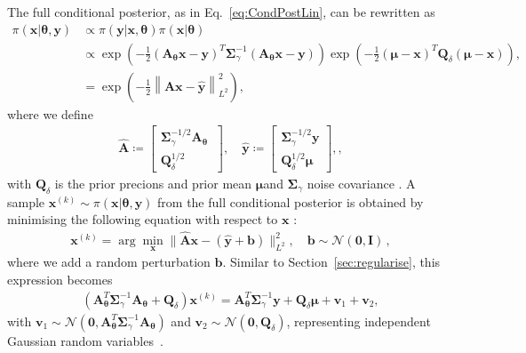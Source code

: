 The full conditional posterior, as in Eq.~\ref{eq:CondPostLin}, can be rewritten as
\begin{align}
	\pi(\bm{x} | \bm{\theta},  \bm{y}) & \propto \pi(\bm{y}|\bm{x}, \bm{\theta}) \pi(\bm{x}| \bm{\theta})\\
	&\propto \exp \left(-\frac{1}{2} (\bm{A}_{\bm{\theta}}  \bm{x} - \bm{y})^T \bm{\Sigma}^{-1}_{\gamma} (\bm{A}_{\bm{\theta}}   \bm{x} - \bm{y})\right) \exp \left(-\frac{1}{2} (\bm{\mu} - \bm{x} )^T \bm{Q}_{\delta}(\bm{\mu} - \bm{x} ) \right),\\
	& = \exp \left( - \frac{1}{2}\left\lVert \hat{\bm{A}} \bm{x} - \hat{\bm{y}} \right\rVert_{L^2}^2 \right),
\end{align}
where we define
\begin{align}
	\label{eq:minimizer}
	\hat{\bm{A}} \coloneqq 
	\begin{bmatrix}
		\bm{\Sigma}_{\gamma}^{-1/2} \bm{A}_{\bm{\theta}} \ \\
		\bm{Q}_{\delta}^{1/2}
	\end{bmatrix}, \quad 
	\hat{\bm{y}} \coloneqq 
	\begin{bmatrix}
		\bm{\Sigma}_{\gamma}^{-1/2} \bm{y} \\
		\bm{Q}_{\delta}^{1/2} \bm{\mu}
	\end{bmatrix} , ,
\end{align}
with $\bm{Q}_{\delta}$ is the prior precions  and prior mean $\bm{\mu}$and $\bm{\Sigma}_{\gamma}$ noise covariance \cite{bardsley2014randomize,BardsleyTC2019RTO}.
A sample $\bm{x}^{(k)} \sim \pi(\bm{x}|   \bm{\theta}, \bm{y}) $ from the full conditional posterior is obtained by minimising the following equation with respect to $\bm{x}$ :
\begin{align}
	\bm{x}^{(k)} = \arg \min_{\bm{x}} \lVert \hat{\bm{A}} \bm{x} - ( \hat{\bm{y}} + \bm{b} ) \rVert_{L^2}^2 , \quad \bm{b} \sim \mathcal{N}(\bm{0}, \mathbf{I}) \, ,
\end{align}
where we add a random perturbation $\bm{b}$.
Similar to Section~\ref{sec:regularise}, this expression becomes
\begin{align}
	\label{eq:RTO}
	\left( \bm{A}_{\bm{\theta}}^T \bm{\Sigma}^{-1}_{\gamma} \bm{A}_{\bm{\theta}} + \bm{Q}_{\delta} \right) \bm{x}^{(k)} = \bm{A}_{\bm{\theta}}^T \bm{\Sigma}^{-1}_{\gamma} \bm{y} + \bm{Q}_{\delta} \bm{\mu} + \bm{v}_1 + \bm{v}_2,
\end{align}
with $\bm{v}_1 \sim \mathcal{N}(\bm{0}, \bm{A}_{\bm{\theta}}^T \bm{\Sigma}^{-1}_{\gamma} \bm{A}_{\bm{\theta}})$ and $\bm{v}_2 \sim \mathcal{N}(\bm{0}, \bm{Q}_{\delta})$, representing independent Gaussian random variables~\cite{bardsley2012mcmc, fox2016fast}.



